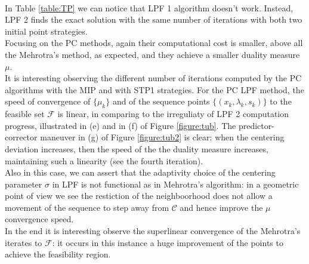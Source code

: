 \documentclass[a4paper,10 pt,titlepage,twoside]{book}
\theoremstyle{plain}
\theoremstyle{definition}
\theoremstyle{remark}
\begin{document}
\\In Table \ref{table:TP} we can notice that LPF 1 algorithm doesn't work. Instead, LPF 2 finds the exact solution with the same number of iterations with both two initial point strategies. \\
Focusing on the PC methods, again their computational cost is smaller, above all the Mehrotra's method, as expected, and they achieve a smaller duality measure $\mu$.\\ It is interesting observing the different number of iterations computed by the PC algorithms with the MIP and with STP1 strategies. For the PC LPF method, the speed of convergence of $\{\mu_{k}\}$ and of the sequence points $\{(x_{k},\lambda_{k},s_{k})\}$ to the feasible set $\mathcal{F}$ is linear, in comparing to the irreguliaty of LPF 2 computation progress, illustrated in (e) and in (f) of Figure \ref{figure:tub}.
The predictor-corrector maneuver in (g) of Figure \ref{figure:tub2} is clear: when the centering deviation increases, then the speed of the the duality measure increases, maintaining such a linearity (see the fourth iteration).\\
Also in this case, we can assert that the adaptivity choice of the centering parameter $\sigma$ in LPF is not functional as in Mehrotra's algorithm: in a geometric point of view we see the restiction of the neighboorhood does not allow a movement of the sequence to step away from $\mathcal{C}$ and hence improve the $\mu$ convergence speed.\\
In the end it is interesting observe the superlinear convergence of the Mehrotra's iterates to $\mathcal{F}$: it occurs in this instance a huge improvement of the points to achieve the feasibility region.
\end{document}
